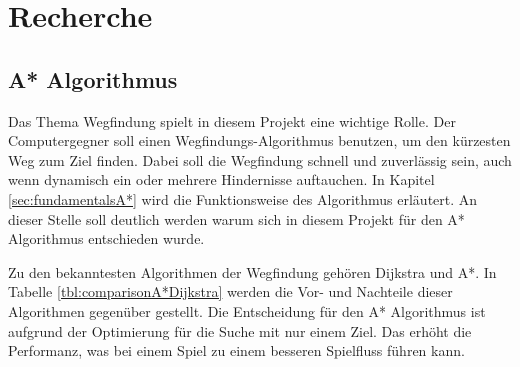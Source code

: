 \chapter{Recherche}
\label{sec:recherche}


\section{A* Algorithmus}
Das Thema Wegfindung spielt in diesem Projekt eine wichtige Rolle. Der Computergegner soll einen Wegfindungs-Algorithmus benutzen, um den kürzesten Weg zum Ziel finden. Dabei soll die Wegfindung schnell und zuverlässig sein, auch wenn dynamisch ein oder mehrere Hindernisse auftauchen. In Kapitel \ref{sec:fundamentalsA*} wird die Funktionsweise des Algorithmus erläutert. An dieser Stelle soll deutlich werden warum sich in diesem Projekt für den A* Algorithmus entschieden wurde.

Zu den bekanntesten Algorithmen der Wegfindung gehören Dijkstra und A*. In Tabelle \ref{tbl:comparisonA*Dijkstra} werden die Vor- und Nachteile dieser Algorithmen gegenüber gestellt. Die Entscheidung für den A* Algorithmus ist aufgrund der Optimierung für die Suche mit nur einem Ziel. Das erhöht die Performanz, was bei einem Spiel zu einem besseren Spielfluss führen kann. \cite{astar_performance}

